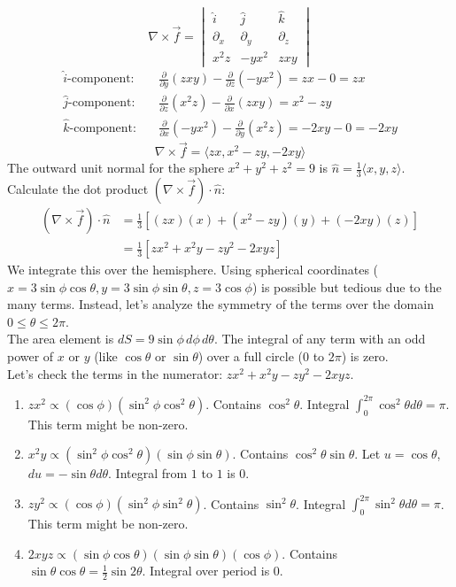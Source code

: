 \documentclass{article}
\begin{document}
\[
	\nabla \times \vec{f} = \begin{vmatrix} \hat{i} & \hat{j} & \hat{k} \\ \partial_x & \partial_y & \partial_z \\ x^2 z & -yx^2 & zxy \end{vmatrix}
\]
\begin{align*}
	\text{$\hat{i}$-component:} & \quad \frac{\partial}{\partial y}(zxy) - \frac{\partial}{\partial z}(-yx^2) = zx - 0 = zx       \\
	\text{$\hat{j}$-component:} & \quad \frac{\partial}{\partial z}(x^2 z) - \frac{\partial}{\partial x}(zxy) = x^2 - zy          \\
	\text{$\hat{k}$-component:} & \quad \frac{\partial}{\partial x}(-yx^2) - \frac{\partial}{\partial y}(x^2 z) = -2xy - 0 = -2xy
\end{align*}
\[
	\nabla \times \vec{f} = \langle zx, x^2 - zy, -2xy \rangle
\]
The outward unit normal for the sphere $x^2+y^2+z^2=9$ is
$\hat{n} = \frac{1}{3}\langle x, y, z \rangle$. Calculate the dot product
$(\nabla \times \vec{f}) \cdot \hat{n}$:
\begin{align*}
	(\nabla \times \vec{f}) \cdot \hat{n} & = \frac{1}{3} \left[ (zx)(x) + (x^2 - zy)(y) + (-2xy)(z) \right] \\
	                                      & = \frac{1}{3} [ zx^2 + x^2y - zy^2 - 2xyz ]
\end{align*}
We integrate this over the hemisphere. Using spherical coordinates
($x=3\sin\phi\cos\theta, y=3\sin\phi\sin\theta, z=3\cos\phi$) is possible but
tedious due to the many terms. Instead, let's analyze the symmetry of the terms
over the domain $0 \le \theta \le 2\pi$.
\\
The area element is $dS = 9\sin\phi \, d\phi \, d\theta$.
The integral of any term with an odd power of $x$ or $y$ (like $\cos\theta$ or
$\sin\theta$) over a full circle ($0$ to $2\pi$) is zero.
\\
Let's check the terms in the numerator: $zx^2 + x^2y - zy^2 - 2xyz$.
\begin{enumerate}
	\item $zx^2 \propto (\cos\phi)(\sin^2\phi\cos^2\theta)$. Contains $\cos^2\theta$. Integral $\int_0^{2\pi} \cos^2\theta d\theta = \pi$. This term might be non-zero.
	\item $x^2y \propto (\sin^2\phi\cos^2\theta)(\sin\phi\sin\theta)$. Contains $\cos^2\theta\sin\theta$. Let $u=\cos\theta$, $du=-\sin\theta d\theta$. Integral from $1$ to $1$ is 0.
	\item $zy^2 \propto (\cos\phi)(\sin^2\phi\sin^2\theta)$. Contains $\sin^2\theta$. Integral $\int_0^{2\pi} \sin^2\theta d\theta = \pi$. This term might be non-zero.
	\item $2xyz \propto (\sin\phi\cos\theta)(\sin\phi\sin\theta)(\cos\phi)$. Contains $\sin\theta\cos\theta = \frac{1}{2}\sin 2\theta$. Integral over period is 0.
\end{enumerate}
\end{document}
